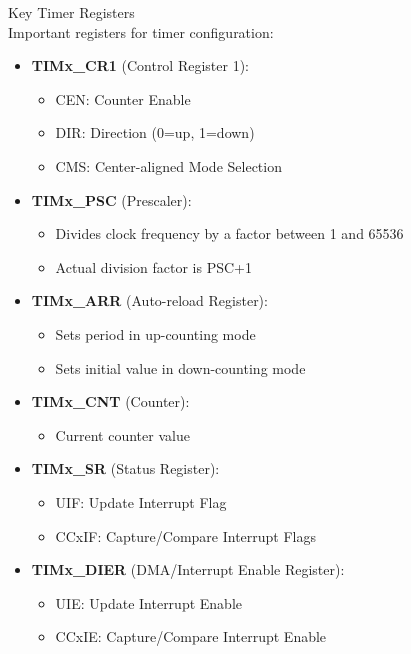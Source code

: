 \begin{corollary}{Key Timer Registers}\\
Important registers for timer configuration:
\begin{itemize}
    \item \textbf{TIMx\_CR1} (Control Register 1):
    \begin{itemize}
        \item CEN: Counter Enable
        \item DIR: Direction (0=up, 1=down)
        \item CMS: Center-aligned Mode Selection
    \end{itemize}
    \item \textbf{TIMx\_PSC} (Prescaler):
    \begin{itemize}
        \item Divides clock frequency by a factor between 1 and 65536
        \item Actual division factor is PSC+1
    \end{itemize}
    \item \textbf{TIMx\_ARR} (Auto-reload Register):
    \begin{itemize}
        \item Sets period in up-counting mode
        \item Sets initial value in down-counting mode
    \end{itemize}
    \item \textbf{TIMx\_CNT} (Counter):
    \begin{itemize}
        \item Current counter value
    \end{itemize}
    \item \textbf{TIMx\_SR} (Status Register):
    \begin{itemize}
        \item UIF: Update Interrupt Flag
        \item CCxIF: Capture/Compare Interrupt Flags
    \end{itemize}
    \item \textbf{TIMx\_DIER} (DMA/Interrupt Enable Register):
    \begin{itemize}
        \item UIE: Update Interrupt Enable
        \item CCxIE: Capture/Compare Interrupt Enable
    \end{itemize}
\end{itemize}
\end{corollary}

